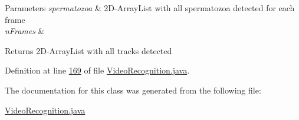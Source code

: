 \begin{DoxyParams}{Parameters}
{\em spermatozoa} & 2\+D-\/\+Array\+List with all spermatozoa detected for each frame \\
\hline
{\em n\+Frames} & \\
\hline
\end{DoxyParams}
\begin{DoxyReturn}{Returns}
2\+D-\/\+Array\+List with all tracks detected 
\end{DoxyReturn}


Definition at line \hyperlink{_video_recognition_8java_source_l00169}{169} of file \hyperlink{_video_recognition_8java_source}{Video\+Recognition.\+java}.



The documentation for this class was generated from the following file\+:\begin{DoxyCompactItemize}
\item 
\hyperlink{_video_recognition_8java}{Video\+Recognition.\+java}\end{DoxyCompactItemize}
